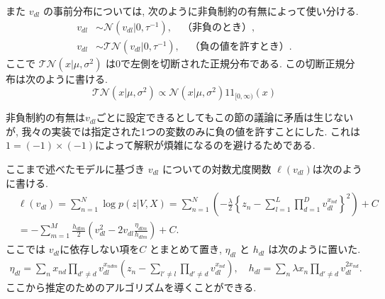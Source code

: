 \documentclass[a4paper,12ptc]{jsarticle} %
\newcommand{\normal}{\mathcal{N}}
\newcommand{\truncnorm}{\mathcal{TN}}
\newcommand{\C}{C}
\newcommand{\one}{1\!\!1}
\begin{document}
また $v_{dl}$ の事前分布については, 次のように非負制約の有無によって使い分ける.
\begin{align}
v_{dl} & \sim \normal(v_{dl} | 0,\tau^{-1}), \quad  \mbox{（非負のとき）} \label{eq_prior1}, \\
v_{dl} & \sim \truncnorm(v_{dl} | 0, \tau^{-1}), \quad  \mbox{（負の値を許すとき）.} \label{eq_prior2}
\end{align}
ここで $\truncnorm(x | \mu, \sigma^2)$ は0で左側を切断された正規分布である.
この切断正規分布は次のように書ける.
\begin{equation*}
   \truncnorm(x | \mu, \sigma^2) \propto  \normal(x | \mu, \sigma^2) \one_{[0,\infty)}(x) 
\end{equation*}

非負制約の有無は$v_{dl}$ごとに設定できるとしてもこの節の議論に矛盾は生じないが, 我々の実装では指定された1つの変数のみに負の値を許すことにした. これは$1=(-1)\times(-1)$によって解釈が煩雑になるのを避けるためである.

ここまで述べたモデルに基づき $v_{dl}$ についての対数尤度関数 $\ell(v_{dl})$は次のように書ける.
\begin{align*}
& \ell(v_{dl}) =\sum_{n=1}^{N} \log p(z|V, X)= \sum_{n=1}^{N}\left(-\frac{\lambda}{2}\left\{ z_n -\sum_{l=1}^L\prod_{d=1}^D v_{dl}^{x_{nd}} \right\}^2\right)+ \C\\
&= -\sum_{m=1}^M\frac{h_{dlm}}{2}\left(v_{dl}^2-2v_{dl}\frac{\eta_{dlm}}{h_{dlm}}\right) +C.
\end{align*}
ここでは $v_{dl}$に依存しない項を$C$ とまとめて置き, $\eta_{dl}$ と $h_{dl}$ は次のように置いた.
\begin{align*}
\eta_{dl} = \sum_n x_{nd} \prod_{d' \neq d} v_{dl}^{x_{ndm}}\left( z_{n} - \sum_{l'\neq l} \prod_{d' \neq d} v_{dl}^{x_{nd}} \right), \quad  h_{dl} = \sum_n \lambda x_{n} \prod_{d' \neq d} v_{dl}^{2x_{nd}}. %
\end{align*}
ここから推定のためのアルゴリズムを導くことができる.
\end{document}
